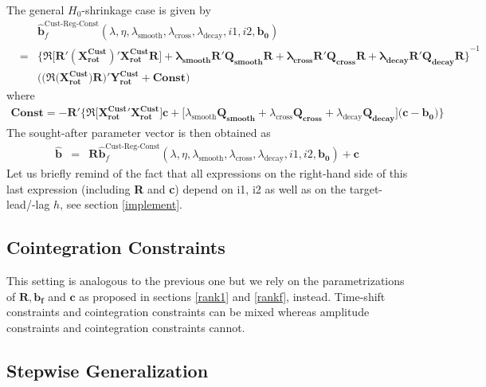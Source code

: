 \documentclass[11pt]{article}
\begin{document}
The general $H_0$-shrinkage case is given by 
\begin{eqnarray*}
&&\mathbf{\hat{b}}^{\textrm{Cust-Reg-Const}}_f(\lambda,\eta,\lambda_{\textrm{smooth}},\lambda_{\textrm{cross}},\lambda_{\textrm{decay}},i1,i2,\mathbf{b_0})\nonumber\\
&=&\mathbf{\Big\{\Re\Big[R'(X_{\textrm{rot}}^{\textrm{Cust} })' X_{\textrm{rot}}^{\textrm{Cust}}R\Big]+
\lambda_{\textrm{smooth}}\mathbf{R'Q_{smooth}}R+\lambda_{\textrm{cross}}\mathbf{R'Q_{cross}R}+\lambda_{\textrm{decay}}\mathbf{R'Q_{decay}R}
\Big\}}^{-1}\nonumber\\
&&\Big((\Re(\mathbf{X_{\textrm{rot}}^{\textrm{Cust}})R)}'
\mathbf{Y_{\textrm{rot}}^{\textrm{Cust}}}+\mathbf{Const}\Big)
\end{eqnarray*}
where 
\begin{eqnarray*}
\mathbf{Const}=-\mathbf{R}'\Bigg\{\Re\Big[\mathbf{X_{\textrm{rot}}^{\textrm{Cust}}}'\mathbf{X_{\textrm{rot}}^{\textrm{Cust}}}\Big]\mathbf{c}+
\Big[\lambda_{\textrm{smooth}}\mathbf{Q_{\textrm{smooth}}}+\lambda_{\textrm{cross}}\mathbf{Q_{\textrm{cross}}}+
\lambda_{\textrm{decay}}\mathbf{Q_{\textrm{decay}}}\Big](\mathbf{c-b_0)}\Bigg\}
\end{eqnarray*}
The sought-after parameter vector is then obtained as
\begin{eqnarray*}
\mathbf{\hat{b}}&=&\mathbf{R} \mathbf{\hat{b}}^{\textrm{Cust-Reg-Const}}_f(\lambda,\eta,\lambda_{\textrm{smooth}},\lambda_{\textrm{cross}},\lambda_{\textrm{decay}},i1,i2,\mathbf{b_0})+\mathbf{c}
\end{eqnarray*}
Let us briefly remind of the fact that all expressions on the right-hand side of this last expression (including \textbf{R} and \textbf{c}) depend on i1, i2 as well as on the target-lead/-lag $h$, see section \ref{implement}.\\


\subsection{Cointegration Constraints}
This setting is analogous to the previous one but we rely on the parametrizations of $\mathbf{R,b_f}$ and $\mathbf{c}$ as proposed in sections \ref{rank1} and \ref{rankf}, instead. Time-shift constraints and cointegration constraints can be mixed whereas amplitude constraints and cointegration constraints cannot.

\subsection{Stepwise Generalization}
\end{document}

